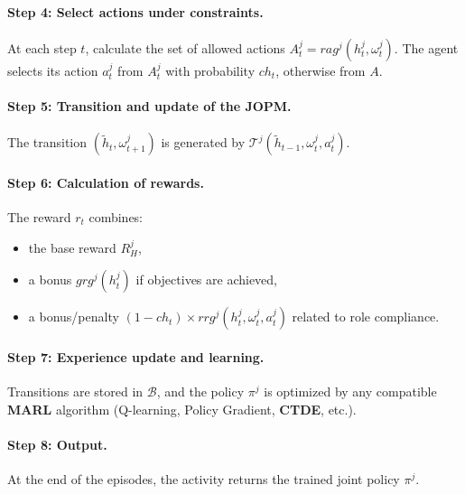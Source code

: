 \documentclass[pdflatex,sn-mathphys-num]{sn-jnl}%
\theoremstyle{thmstyleone}%
\theoremstyle{thmstyletwo}%
\theoremstyle{thmstylethree}%
\begin{document}
\paragraph*{Step 4: Select actions under constraints.}
At each step $t$, calculate the set of allowed actions $A_t^j = rag^j(h^j_t,\omega_t^j)$.
The agent selects its action $a_t^j$ from $A_t^j$ with probability $ch_t$, otherwise from $A$.

\paragraph*{Step 5: Transition and update of the JOPM.}
The transition $(\tilde{h}_t,\omega_{t+1}^j)$ is generated by $\mathcal{T}^j(\tilde{h}_{t-1},\omega_t^j,a_t^j)$.

\paragraph*{Step 6: Calculation of rewards.}
The reward $r_t$ combines:
\begin{itemize}
    \item the base reward $R^j_H$,
    \item a bonus $grg^j(h^j_t)$ if objectives are achieved,
    \item a bonus/penalty $(1-ch_t)\times rrg^j(h^j_t,\omega_t^j,a_t^j)$ related to role compliance.
\end{itemize}

\paragraph*{Step 7: Experience update and learning.}
Transitions are stored in $\mathcal{B}$, and the policy $\pi^j$ is optimized by any compatible \textbf{MARL} algorithm (Q-learning, Policy Gradient, \textbf{CTDE}, etc.).

\paragraph*{Step 8: Output.}
At the end of the episodes, the activity returns the trained joint policy $\pi^j$.
\end{document}
